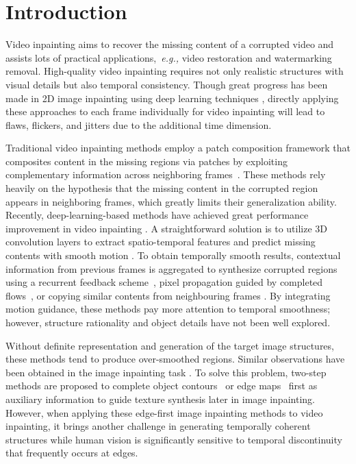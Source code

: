 

\section{Introduction}


Video inpainting aims to recover the missing content of a corrupted video and assists lots of practical applications,~\emph{e.g.,} video restoration and watermarking removal. 
High-quality video inpainting requires not only realistic structures with visual details but also temporal consistency. 
Though great progress has been made in 2D image inpainting using deep learning techniques \cite{yu2018free,Xiong_2019_CVPR,wang2018high}, directly applying these approaches to each frame individually for video inpainting will lead to flaws, flickers, and jitters due to the additional time dimension. 



Traditional video inpainting methods employ a patch composition framework that composites content in the missing regions via patches by exploiting complementary information across neighboring frames~\cite{patwardhan2007video,wexler2004space,newson2014video}.
% 
These methods rely heavily on the hypothesis that the missing content in the corrupted region appears in neighboring frames, which greatly limits their generalization ability.
%
Recently, deep-learning-based methods have achieved great performance improvement in video inpainting \cite{wang2019video,Kim_2019_CVPR1,Xu_2019_CVPR,Kim_2019_CVPR,lee2019copy,oh2019onion}.
A straightforward solution is to utilize 3D convolution layers to extract spatio-temporal features and predict missing contents with smooth motion \cite{wang2019video}.
To obtain temporally smooth results, contextual information from previous frames is aggregated to synthesize corrupted regions using a recurrent feedback scheme~\cite{Kim_2019_CVPR1,Kim_2019_CVPR}, pixel propagation guided by completed flows~\cite{Xu_2019_CVPR}, 
{\color{blue}or copying similar contents from neighbouring frames \cite{lee2019copy,oh2019onion}.}  
By integrating motion guidance, these methods pay more attention to temporal smoothness; however, structure rationality and object details have not been well explored. 


Without definite representation and generation of the target image structures, these methods tend to produce over-smoothed regions. 
Similar observations have been obtained in the image inpainting task \cite{Xiong_2019_CVPR,nazeri2019edgeconnect}.
To solve this problem, two-step methods are proposed to complete object contours~\cite{Xiong_2019_CVPR} or edge maps~\cite{nazeri2019edgeconnect} first as auxiliary information to guide texture synthesis later in image inpainting.
%
However, when applying these edge-first image inpainting methods to video inpainting, it brings another challenge in generating temporally coherent structures while human vision is significantly sensitive to temporal discontinuity that frequently occurs at edges. 



